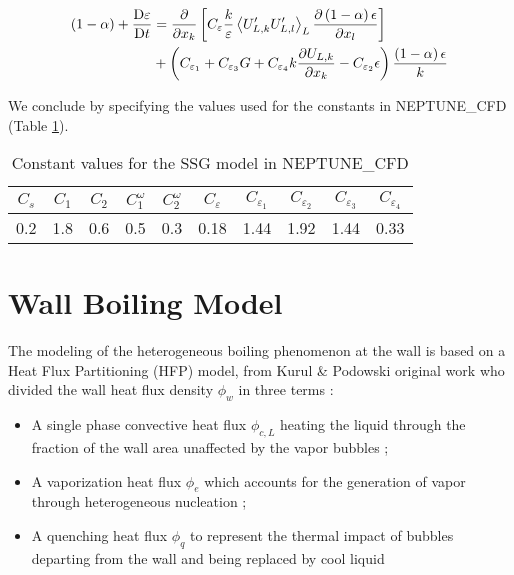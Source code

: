 \begin{align}
\left( 1-\alpha \right)+\frac{\mathrm{D}\varepsilon}{\mathrm{D}t}  &= \frac{\partial}{\partial x_{k}}\left[  C_{\varepsilon} \frac{k}{\varepsilon}\left< U'_{L,k}U'_{L,l} \right>_{L}  \frac{\partial \left( 1-\alpha \right) \epsilon}{\partial x_{l}}  \right] \\
&+ \left( C_{\varepsilon_{1}} + C_{\varepsilon_{3}}G + C_{\varepsilon_{4}}k\frac{\partial U_{L,k}}{\partial x_{k}} - C_{\varepsilon_{2}}\epsilon  \right) \frac{\left( 1-\alpha \right)\epsilon}{k}
\end{align}

\npar

We conclude by specifying the values used for the constants in NEPTUNE\_CFD (Table \ref{tab:ncfd_ssg_constants}).


\begin{table}[!h]
\centering
\begin{tabular}{c c c c c c c c c c} 
\hline
$C_{s}$ & $C_{1}$ & $C_{2}$ & $C_{1}^{\omega}$ & $C_{2}^{\omega}$ & $C_{\varepsilon}$ & $C_{\varepsilon_{1}}$ & $C_{\varepsilon_{2}}$ & $C_{\varepsilon_{3}}$ & $C_{\varepsilon_{4}}$ \\
\hline
0.2 & 1.8 & 0.6 & 0.5 & 0.3 & 0.18 & 1.44 & 1.92 & 1.44 & 0.33\\
\hline
\end{tabular}

\caption{Constant values for the SSG model in NEPTUNE\_CFD}
\label{tab:ncfd_ssg_constants}

\end{table}




\section{Wall Boiling Model}
\label{sec:ncfd_HFP}

The modeling of the heterogeneous boiling phenomenon at the wall is based on a Heat Flux Partitioning (HFP) model,  from Kurul \& Podowski original work\cite{kurul_multidimensional_1990} who divided the wall heat flux density $\phi_{w}$ in three terms  :

\begin{itemize}
\item A single phase convective heat flux $\phi_{c,L}$ heating the liquid through the fraction of the wall area unaffected by the vapor bubbles ;
\item A vaporization heat flux $\phi_{e}$ which accounts for the generation of vapor through heterogeneous nucleation ;
\item A quenching heat flux $\phi_{q}$ to represent the thermal impact of bubbles departing from the wall and being replaced by cool liquid
\end{itemize}

